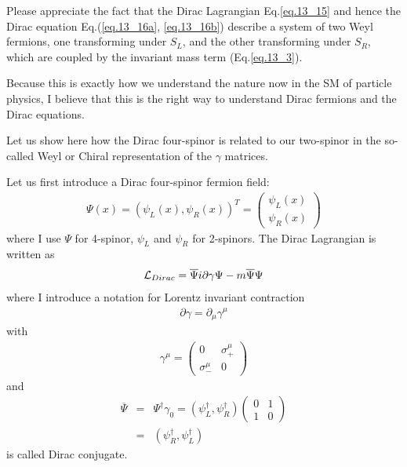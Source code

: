 \documentclass[12pt]{article}
\def\del{{\partial}}
\begin{document}
  Please appreciate the fact that the Dirac Lagrangian Eq.\ref{eq.13_15} and hence the Dirac equation Eq.(\ref{eq.13_16a}, \ref{eq.13_16b}) describe a system of two Weyl fermions, one transforming under $S_L$, and the other transforming under $S_R$, which are coupled by the invariant mass term (Eq.\ref{eq.13_3}).

  Because this is exactly how we understand the nature now in the SM
  of particle physics, I believe that this is the right way to understand
  Dirac fermions and the Dirac equations.

  Let us show here how the Dirac four-spinor is related to our two-spinor
  in the so-called Weyl or Chiral representation of the $\gamma$ matrices.

  Let us first introduce a Dirac four-spinor fermion field:
\begin{eqnarray}
  \Psi(x) = ( \psi_L(x), \psi_R(x) )^T = 
  \begin{pmatrix}
    \psi_L(x) \\ \psi_R(x)
  \end{pmatrix} \label{eq.13_23}
\end{eqnarray}
  where I use $\Psi$ for 4-spinor, $\psi_L$ and $\psi_R$ for 2-spinors.  The
  Dirac Lagrangian is written as
\begin{eqnarray}
  {\cal L}_{Dirac} = {\overline \Psi} i\del \gamma \Psi - m {\overline \Psi} \Psi \label{eq.13_24}
\end{eqnarray}
  where I introduce a notation for Lorentz invariant contraction
\begin{eqnarray}
  \del \gamma = \del_\mu \gamma^\mu \label{eq.13_25}
\end{eqnarray}
  with
\begin{eqnarray}
  \gamma^\mu =
  \begin{pmatrix}
    0 & \sigma_+^\mu \\
    \sigma_-^\mu & 0
  \end{pmatrix} \label{eq.13_26}
\end{eqnarray}
  and
\begin{eqnarray}
  {\overline \Psi} &=& \Psi^\dagger \gamma_0
              = ( \psi_L^\dagger, \psi_R^\dagger )
              \begin{pmatrix}
                0 & 1 \\
                1 & 0
              \end{pmatrix}  \\
        &=& ( \psi_R^\dagger, \psi_L^\dagger ) \label{eq.13_27}
\end{eqnarray}
  is called Dirac conjugate.
\end{document}
